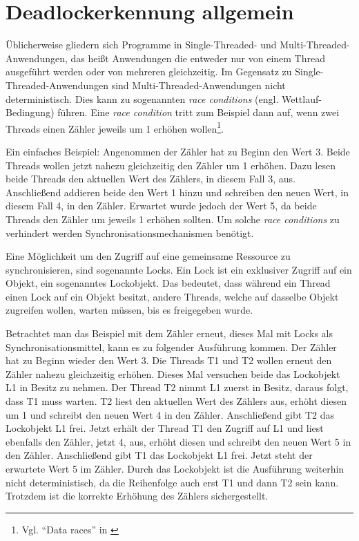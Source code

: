 \section{Deadlockerkennung allgemein}
\label{section:Deadlockerkennung allgemein}
Üblicherweise gliedern sich Programme in  Single-Threaded- und
Multi-Threaded-Anwendungen, das heißt Anwendungen die entweder nur von einem
Thread ausgeführt werden oder von mehreren gleichzeitig. Im Gegensatz zu
Single-Threaded-Anwendungen sind Multi-Threaded-Anwendungen nicht
deterministisch. Dies kann zu sogenannten \emph{race conditions} (engl.
Wettlauf-Bedingung) führen. Eine \emph{race condition} tritt zum Beispiel dann
auf, wenn zwei Threads einen Zähler jeweils um 1 erhöhen wollen\footnote{Vgl.
"`Data races"' in \autocite[70]{netzer1992race}}.

Ein einfaches Beispiel: Angenommen der Zähler hat zu Beginn den Wert 3. Beide
Threads wollen jetzt nahezu gleichzeitig den Zähler um 1 erhöhen. Dazu lesen
beide Threads den aktuellen Wert des Zählers, in diesem Fall 3, aus.
Anschließend addieren beide den Wert 1 hinzu und schreiben den neuen Wert, in
diesem Fall 4, in den Zähler. Erwartet wurde jedoch der Wert 5, da beide Threads
den Zähler um jeweils 1 erhöhen sollten. Um solche \emph{race conditions} zu
verhindert werden Synchronisationsmechanismen benötigt.

Eine Möglichkeit um den Zugriff auf eine gemeinsame Ressource zu
synchronisieren, sind sogenannte Locks. Ein Lock ist ein exklusiver Zugriff auf
ein Objekt, ein sogenanntes Lockobjekt. Das bedeutet, dass während ein Thread
einen Lock auf ein Objekt besitzt, andere Threads, welche auf dasselbe Objekt
zugreifen wollen, warten müssen, bis es freigegeben wurde.

Betrachtet man das Beispiel mit dem Zähler erneut, dieses Mal mit Locks als
Synchronisationsmittel, kann es zu folgender Ausführung kommen. Der Zähler hat
zu Beginn wieder den Wert 3. Die Threads \textrm{T1} und \textrm{T2} wollen
erneut den Zähler nahezu gleichzeitig erhöhen. Dieses Mal versuchen beide das
Lockobjekt \textrm{L1} in Besitz zu nehmen. Der Thread \textrm{T2} nimmt
\textrm{L1} zuerst in Besitz, daraus folgt, dass \textrm{T1} muss warten. \textrm{T2}
liest den aktuellen Wert des Zählers aus, erhöht diesen um 1 und schreibt den
neuen Wert 4 in den Zähler. Anschließend gibt \textrm{T2} das Lockobjekt
\textrm{L1} frei. Jetzt erhält der Thread \textrm{T1} den Zugriff auf
\textrm{L1} und liest ebenfalls den Zähler, jetzt 4, aus, erhöht diesen und
schreibt den neuen Wert 5 in den Zähler. Anschließend gibt \textrm{T1} das
Lockobjekt \textrm{L1} frei. Jetzt steht der erwartete Wert 5 im Zähler. Durch
das Lockobjekt ist die Ausführung weiterhin nicht deterministisch, da die
Reihenfolge auch erst \textrm{T1} und dann \textrm{T2} sein kann. Trotzdem ist
die korrekte Erhöhung des Zählers sichergestellt.


